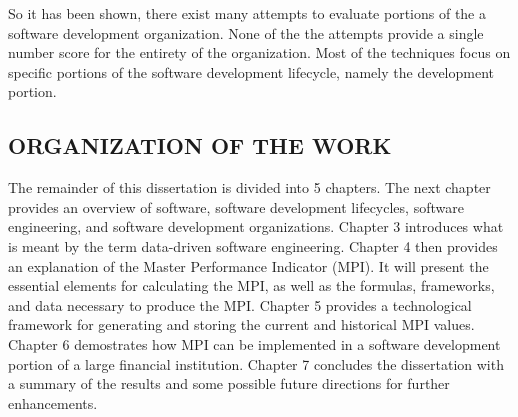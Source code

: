 \documentclass[SDSUThesis.tex]{subfiles}
\begin{document}
    So it has been shown, there exist many attempts to 
    evaluate portions of the a software development 
    organization.  None of the the attempts provide
    a single number score for the entirety of the 
    organization.  Most of the techniques focus on
    specific portions of the software development 
    lifecycle, namely the development portion. 
    
    


\subsection{ORGANIZATION OF THE WORK}

The remainder of this dissertation is divided into 5 chapters.  The next chapter provides
an overview of software, software development lifecycles, software engineering, and software
development organizations.  Chapter 3 introduces what is meant by the term data-driven
software engineering. Chapter 4 then provides an explanation of the Master Performance 
Indicator (MPI).  It will present the essential elements for calculating the MPI, as well
as the formulas, frameworks, and data necessary to produce the MPI. Chapter 5 provides
a technological framework for generating and storing the current and historical MPI values.
Chapter 6 demostrates how MPI can be implemented in a software development portion of 
a large financial institution.  Chapter 7 concludes the dissertation with a summary
of the results and some possible future directions for further enhancements. 
\end{document}
